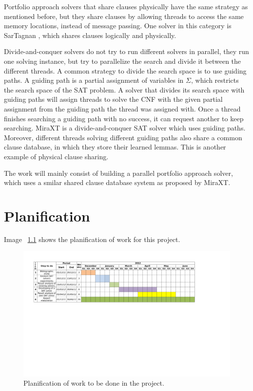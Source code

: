 \documentclass[12pt]{diicc}
\begin{document}
Portfolio approach solvers that share clauses physically have the same strategy as mentioned before, but they share clauses by allowing threads to access the same memory locations, instead of message passing. One solver in this category is SarTagnan \cite{sartagnan}, which shares clauses logically and physically. 

Divide-and-conquer solvers do not try to run different solvers in parallel, they run one solving instance, but try to parallelize the search and divide it between the different threads. A common strategy to divide the search space is to use guiding paths. A guiding path is a partial assignment of variables in $\Sigma$, which restricts the search space of the SAT problem. A solver that divides its search space with guiding paths will assign threads to solve the CNF with the given partial assignment from the guiding path the thread was assigned with. Once a thread finishes searching a guiding path with no success, it can request another to keep searching. MiraXT \cite{miraxt} is a divide-and-conquer SAT solver which uses guiding paths. Moreover, different threads solving different guiding paths also share a common clause database, in which they store their learned lemmas. This is another example of physical clause sharing. 

The work will mainly consist of building a parallel portfolio approach solver, which uses a smilar shared clause database system as proposed by MiraXT. 


% 
\chapter{Planification}\label{chap:planification}

Image ~\ref{fig:plan} shows the planification of work for this project.

\begin{figure}[h!]
  \centering
    \includegraphics[angle=90, scale=0.6]{plan}
  \caption{Planification of work to be done in the project.}
  \label{fig:plan}
\end{figure}
\end{document}
